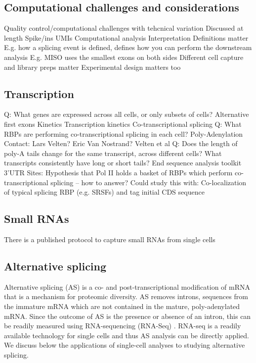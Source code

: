 \subsection{Computational challenges and considerations}
Quality control/computational challenges with tehcnical variation
Discussed at length \cite{Stegle:2015cx}
Spike/ins UMIs \cite{Kivioja2011-dp}
Computational analysis
Interpretation
Definitions matter
E.g. how a splicing event is defined, defines how you can perform the downstream analysis
E.g. MISO uses the smallest exons on both sides
Different cell capture and library preps matter \cite{Ziegenhain:2017kr}
Experimental design matters too \cite{Bacher2016-ze}

\subsection{Transcription}
Q: What genes are expressed across all cells, or only subsets of cells?
Alternative first exons
Kinetics
Transcription kinetics \cite{Livak2013-nv}
Co-transcriptional splicing
Q: What RBPs are performing co-transcriptional splicing in each cell?
Poly-Adenylation
Contact: Lars Velten? Eric Van Nostrand?
Velten et al \cite{Velten:2015ie}
Q: Does the length of poly-A tails change for the same transcript, across different cells? What transcripts consistently have long or short tails?
End sequence analysis toolkit \cite{Derr:2016gk}
3'UTR Sites: \cite{Dueck:2015hd}
Hypothesis that Pol II holds a basket of RBPs which perform co-transcriptional splicing -- how to answer?
Could study this with: Co-localization of typical splicing RBP (e.g. SRSFs) and tag initial CDS sequence


\subsection{Small RNAs}
There is a published protocol to capture small RNAs from single cells \cite{Faridani2016-de}

\subsection{Alternative splicing}
Alternative splicing (AS) is a co- and post-transcriptional modification of mRNA \cite{Ameur2011-wf,Caceres2002-el} that is a mechanism for proteomic diversity. AS removes introns, sequences from the immature mRNA which are not contained in the mature, poly-adenylated mRNA. Since the outcome of AS is the presence or absence of an intron, this can be readily measured using RNA-sequencing (RNA-Seq) \cite{Wang:2008gt}. RNA-seq is a readily available technology for single cells and thus AS analysis can be directly applied. We discuss below the applications of single-cell analyses to studying alternative splicing.

